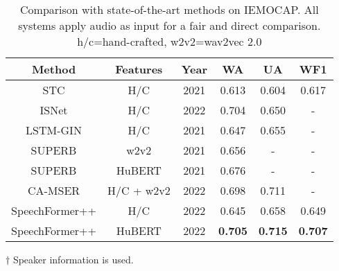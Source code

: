 \documentclass[lettersize,journal]{IEEEtran}
\begin{document}
\begin{table}[t]
    \caption{Performance and computational efficiency of Transformer and SpeechFormer++ using HuBERT features on IEMOCAP. Gain indicates the relative improvement (+) or reduction (-)}
    \label{tab_1}
    \centering
\end{table}

\begin{table}[t]
    \caption{Comparison with state-of-the-art methods on IEMOCAP. All systems apply audio as input for a fair and direct comparison. h/c=hand-crafted, w2v2=wav2vec 2.0}
    \label{tab_2}
    \centering
    \begin{threeparttable}
    \begin{tabular}{ccc||ccc}
    \hline
    Method   & Features  & Year & WA  & UA & WF1   \\ \hline
    STC\cite{stc}       &  H/C     & 2021       & 0.613   & 0.604 & 0.617  \\
    \tnote{$\dagger$}\; ISNet\cite{ISNet}     &  H/C   & 2022         & 0.704   & 0.650  & - \\
    LSTM-GIN\cite{LSTM-GIN}  &  H/C & 2021   & 0.647   & 0.655  & -\\
    SUPERB\cite{superb} & w2v2  & 2021 & 0.656 & - & -  \\ 
    SUPERB\cite{superb} & HuBERT  & 2021 & 0.676 & - & -  \\ 
    CA-MSER\cite{CA-MSER}  & H/C + w2v2   & 2022  & 0.698   & 0.711  & - \\ \hline
    SpeechFormer++   & H/C  & 2022  & 0.645   & 0.658 & 0.649 \\
    SpeechFormer++   & HuBERT  & 2022  & \textbf{0.705}   & \textbf{0.715} & \textbf{0.707} \\ \hline
    \end{tabular}
    \begin{tablenotes}
        \footnotesize
        \item[$\dagger$] Speaker information is used.
    \end{tablenotes}
    \end{threeparttable}\end{table}
\end{document}
